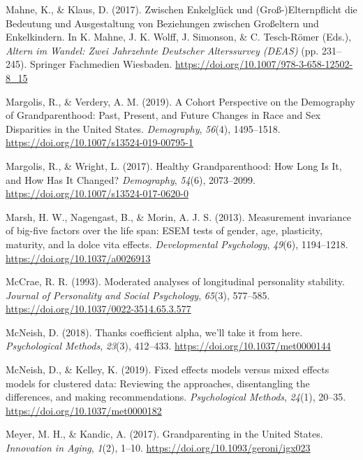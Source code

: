 \documentclass[
  english,
  man, noextraspace]{apa7}
\begin{document}
\leavevmode\hypertarget{ref-mahneZwischenEnkelgluckUnd2017}{}%
Mahne, K., \& Klaus, D. (2017). Zwischen Enkelglück und (Groß-)Elternpflicht die Bedeutung und Ausgestaltung von Beziehungen zwischen Großeltern und Enkelkindern. In K. Mahne, J. K. Wolff, J. Simonson, \& C. Tesch-Römer (Eds.), \emph{Altern im Wandel: Zwei Jahrzehnte Deutscher Alterssurvey (DEAS)} (pp. 231--245). Springer Fachmedien Wiesbaden. \url{https://doi.org/10.1007/978-3-658-12502-8_15}

\leavevmode\hypertarget{ref-margolisCohortPerspectiveDemography2019}{}%
Margolis, R., \& Verdery, A. M. (2019). A Cohort Perspective on the Demography of Grandparenthood: Past, Present, and Future Changes in Race and Sex Disparities in the United States. \emph{Demography}, \emph{56}(4), 1495--1518. \url{https://doi.org/10.1007/s13524-019-00795-1}

\leavevmode\hypertarget{ref-margolisHealthyGrandparenthoodHow2017}{}%
Margolis, R., \& Wright, L. (2017). Healthy Grandparenthood: How Long Is It, and How Has It Changed? \emph{Demography}, \emph{54}(6), 2073--2099. \url{https://doi.org/10.1007/s13524-017-0620-0}

\leavevmode\hypertarget{ref-marshMeasurementInvarianceBigfive2013}{}%
Marsh, H. W., Nagengast, B., \& Morin, A. J. S. (2013). Measurement invariance of big-five factors over the life span: ESEM tests of gender, age, plasticity, maturity, and la dolce vita effects. \emph{Developmental Psychology}, \emph{49}(6), 1194--1218. \url{https://doi.org/10.1037/a0026913}

\leavevmode\hypertarget{ref-mccraeModeratedAnalysesLongitudinal1993}{}%
McCrae, R. R. (1993). Moderated analyses of longitudinal personality stability. \emph{Journal of Personality and Social Psychology}, \emph{65}(3), 577--585. \url{https://doi.org/10.1037/0022-3514.65.3.577}

\leavevmode\hypertarget{ref-mcneishThanksCoefficientAlpha2018}{}%
McNeish, D. (2018). Thanks coefficient alpha, we'll take it from here. \emph{Psychological Methods}, \emph{23}(3), 412--433. \url{https://doi.org/10.1037/met0000144}

\leavevmode\hypertarget{ref-mcneishFixedEffectsModels2019}{}%
McNeish, D., \& Kelley, K. (2019). Fixed effects models versus mixed effects models for clustered data: Reviewing the approaches, disentangling the differences, and making recommendations. \emph{Psychological Methods}, \emph{24}(1), 20--35. \url{https://doi.org/10.1037/met0000182}

\leavevmode\hypertarget{ref-meyerGrandparentingUnitedStates2017}{}%
Meyer, M. H., \& Kandic, A. (2017). Grandparenting in the United States. \emph{Innovation in Aging}, \emph{1}(2), 1--10. \url{https://doi.org/10.1093/geroni/igx023}
\end{document}
